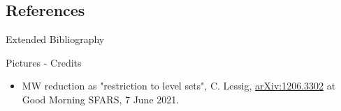 \documentclass[beamer,handout,10pt]{standalone}
\begin{document}


\subsection{References}

\begin{frame}[t,allowframebreaks]{Extended Bibliography}
	\nocite{*}
	
	
\end{frame}





\begin{frame}[t,allowframebreaks]{Pictures - Credits}
	\begin{itemize}
		\item MW reduction as "restriction to level sets", C. Lessig,
			\href{https://arxiv.org/abs/1206.3302}{arXiv:1206.3302}
	at Good Morning SFARS, 7 June 2021.
	\end{itemize}
\end{frame}



\end{document}
